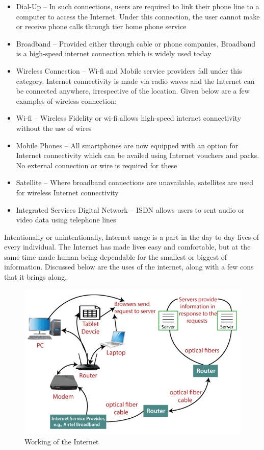 \documentclass[11pt,a4paper,twoside]{article}
\begin{document}
\begin{itemize}
\item Dial-Up – In such connections, users are required to link their phone line to a computer to access the Internet. Under this connection, the user cannot make or receive phone calls through tier home phone service
\item Broadband – Provided either through cable or phone companies, Broadband is a high-speed internet connection which is widely used today
\item Wireless Connection – Wi-fi and Mobile service providers fall under this category. Internet connectivity is made via radio waves and the Internet can be connected anywhere, irrespective of the location. Given below are a few examples of wireless connection:
\item Wi-fi – Wireless Fidelity or wi-fi allows high-speed internet connectivity without the use of wires
\item Mobile Phones – All smartphones are now equipped with an option for Internet connectivity which can be availed using Internet vouchers and packs. No external connection or wire is required for these
\item Satellite – Where broadband connections are unavailable, satellites are used for wireless Internet connectivity
\item Integrated Services Digital Network – ISDN allows users to sent audio or video data using telephone lines
\end{itemize}
Intentionally or unintentionally, Internet usage is a part in the day to day lives of every individual. The Internet has made lives easy and comfortable, but at the same time made human being dependable for the smallest or biggest of information. Discussed below are the uses of the internet, along with a few cons that it brings along.
\begin{figure}[H]
\includegraphics[width=1\textwidth]{Fig 33.jpg}
\caption{Working of the Internet}
\end{figure}
\end{document}
